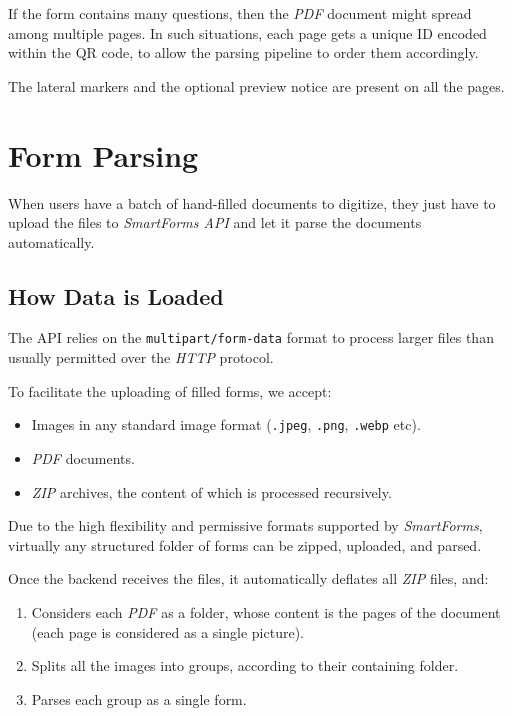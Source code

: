 \documentclass[11pt, a4paper]{report}
\def\code#1{\texttt{#1}}
\begin{document}
If the form contains many questions, then the \textit{PDF} document might spread among multiple pages. In such situations, each page gets a unique ID encoded within the QR code, to allow the parsing pipeline to order them accordingly.

The lateral markers and the optional preview notice are present on all the pages.



\chapter{Form Parsing}
\label{chapter-form-parsing}

When users have a batch of hand-filled documents to digitize, they just have to upload the files to \textit{SmartForms API} and let it parse the documents automatically.

\section{How Data is Loaded}

The API relies on the \code{multipart/form-data} \cite{masinter1998rfc2388} format to process larger files than usually permitted over the \textit{HTTP} protocol.

To facilitate the uploading of filled forms, we accept:
\begin{itemize}
    \item Images in any standard image format (\code{.jpeg}, \code{.png}, \code{.webp} etc).
    \item \textit{PDF} documents.
    \item \textit{ZIP} archives, the content of which is processed recursively.
\end{itemize}

Due to the high flexibility and permissive formats supported by \textit{SmartForms}, virtually any structured folder of forms can be zipped, uploaded, and parsed.

Once the backend receives the files, it automatically deflates all \textit{ZIP} files, and:
\begin{enumerate}
    \item Considers each \textit{PDF} as a folder, whose content is the pages of the document (each page is considered as a single picture).
    \item Splits all the images into groups, according to their containing folder.
    \item Parses each group as a single form.
\end{enumerate}
\end{document}
